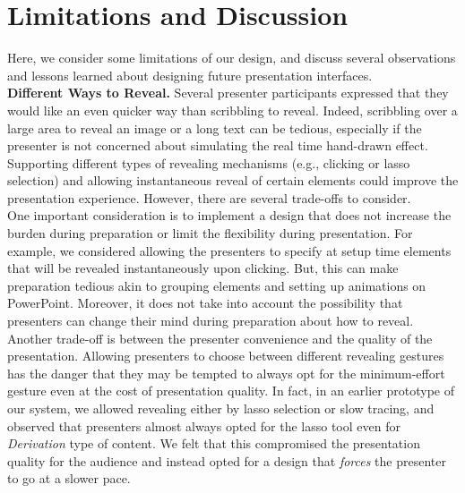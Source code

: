 \section{Limitations and Discussion}
Here, we consider some limitations of our design, and discuss several observations and lessons learned about designing future presentation interfaces.\\

\textbf{Different Ways to Reveal.}  Several presenter participants expressed that they would like an even quicker way than scribbling to reveal. Indeed, scribbling over a large area to reveal an image or a long text can be tedious, especially if the presenter is not concerned about simulating the real time hand-drawn effect. Supporting different types of revealing mechanisms (e.g., clicking or lasso selection) and allowing instantaneous reveal of certain elements could improve the presentation experience. However, there are several trade-offs to consider.\\
One important consideration is to implement a design that does not increase the burden during preparation or limit the flexibility during presentation. For example, we considered allowing the presenters to specify at setup time elements that will be revealed instantaneously upon clicking. But, this can make preparation tedious akin to grouping elements and setting up animations on PowerPoint. Moreover, it does not take into account the possibility that presenters can change their mind during preparation about how to reveal.  \\
Another trade-off is between the presenter convenience and the quality of the presentation. Allowing presenters to choose between different revealing gestures has the danger that they may be tempted to always opt for the minimum-effort gesture even at the cost of presentation quality. In fact, in an earlier prototype of our system, we allowed revealing either by lasso selection or slow tracing, and observed that presenters almost always opted for the lasso tool even for \textit{Derivation} type of content. We felt that this compromised the presentation quality for the audience and instead opted for a design that \textit{forces} the presenter to go at a slower pace.\\

